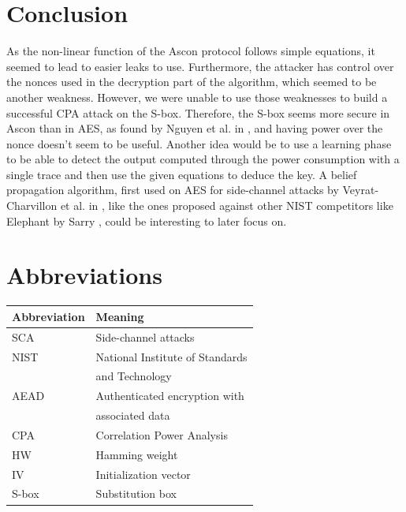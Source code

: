 \documentclass[11pt,technote]{IEEEtran}
\begin{document}
		\section{Conclusion}
		As the non-linear function of the Ascon protocol follows simple equations, it seemed to lead to easier leaks to use. Furthermore, the attacker has control over the nonces used in the decryption part of the algorithm, which seemed to be another weakness. However, we were unable to use those weaknesses to build a successful CPA attack on the S-box. Therefore, the S-box seems more secure in Ascon than in AES, as found by Nguyen et al. in \cite{cpa_analysis}, and having power over the nonce doesn't seem to be useful. Another idea would be to use a learning phase to be able to detect the output computed through the power consumption with a single trace and then use the given equations \cite{these} to deduce the key. A belief propagation algorithm, first used on AES for side-channel attacks by Veyrat-Charvillon et al. in \cite{bp_aes}, like the ones proposed against other NIST competitors like Elephant by Sarry \cite{these}, could be interesting to later focus on.
		
		\appendices
		
		 
		
				
		
		\section{Abbreviations}
		\begin{tabular}{ll}
			\hline
			\textbf{Abbreviation}&\textbf{Meaning}\\
			\hline
			SCA&Side-channel attacks\\
			NIST&National Institute of Standards\\
			&and Technology\\
			AEAD& Authenticated encryption with\\
			&associated data\\
			CPA&Correlation Power Analysis\\
			HW&Hamming weight\\
			IV&Initialization vector\\
			S-box&Substitution box\\
			\hline
		\end{tabular}
		
		
\end{document}
